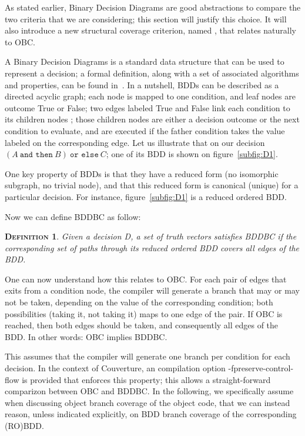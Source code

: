 \documentclass[a4paper,12pt,twoside]{article}
\newcommand{\couv}{{\sc Couverture}}
\newcommand{\andthen}{\texttt{and then}}
\newcommand{\orelse}{\texttt{or else}}
\newtheorem{definition}{\textsc{Definition}}
\begin{document}
As stated earlier, Binary Decision Diagrams are good abstractions to
compare the two criteria that we are considering; this section will
justify this choice. It will also introduce a new structural coverage
criterion, named , that
relates naturally to OBC.

A Binary Decision Diagrams is a standard data structure that can be
used to represent a decision; a formal definition, along with a set of
associated algorithms and properties, can be found
in~\cite{bryant86:graphs}.  In a nutshell, BDDs can be described as a
directed acyclic graph; each node is mapped to one condition, and leaf
nodes are outcome True or False; two edges labeled True and False link
each condition to its children nodes ; those children nodes are either
a decision outcome or the next condition to evaluate, and are executed
if the father condition takes the value labeled on the corresponding
edge. Let us illustrate that on our decision
$(A \ \andthen{} \ B) \ \orelse{} \ C$; one of its BDD is shown on
figure~\ref{subfig:D1}.

One key property of BDDs is that they have a reduced form (no
isomorphic subgraph, no trivial node), and that this reduced form is
canonical (unique) for a particular decision. For instance,
figure~\ref{subfig:D1} is a reduced ordered BDD.

Now we can define BDDBC as follow:

\begin{definition}
  \label{def:bddbc}
  Given a decision D, a set of truth vectors satisfies BDDBC
  if the corresponding set of paths through its reduced ordered BDD
  covers all edges of the BDD.
\end{definition}

One can now understand how this relates to OBC. For each pair of edges that
exits from a condition node, the compiler will generate a branch that
may or may not be taken, depending on the value of the corresponding
condition; both possibilities (taking it, not taking it) maps to one
edge of the pair. If OBC is reached, then both edges should be taken,
and consequently all edges of the BDD. In other words: OBC implies
BDDBC.

This assumes that the compiler will generate one branch per condition
for each decision. In the context of \couv{}, an compilation option
-fpreserve-control-flow is provided that enforces this property; this
allows a straight-forward comparizon between OBC and BDDBC. In the
following, we specifically assume when discussing object branch
coverage of the object code, that we can instead reason, unless
indicated explicitly, on BDD branch coverage of the corresponding
(RO)BDD.
\end{document}
